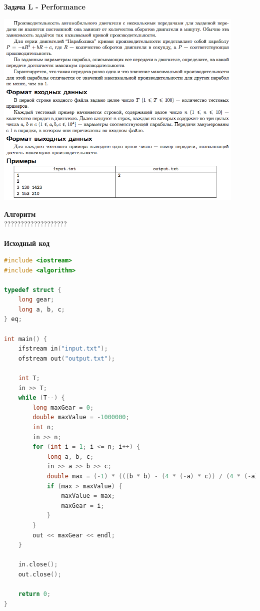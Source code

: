 \documentclass[a4paper,12pt]{article}
\begin{document}
\textbf{{\large Задача L - Performance}} \\
\begin{center}
\includegraphics[width=0.9\textwidth]{OC_Udmurtia/OC_Udmurtia_L.png}\\ [1cm]
\end{center}
\newpage

\textbf{{\large Алгоритм}} \\
{\Huge ???????????????????} \\ 
\\
\textbf{{\large Исходный код}}
\begin{lstlisting}[language=C++]
#include <iostream>
#include <algorithm>

typedef struct {
    long gear;
    long a, b, c;
} eq;

int main() {
    ifstream in("input.txt");
    ofstream out("output.txt");

    int T;
    in >> T;
    while (T--) {
        long maxGear = 0;
        double maxValue = -1000000;
        int n;
        in >> n;
        for (int i = 1; i <= n; i++) {
            long a, b, c;
            in >> a >> b >> c;
            double max = (-1) * (((b * b) - (4 * (-a) * c)) / (4 * (-a)));
            if (max > maxValue) {
                maxValue = max;
                maxGear = i;
            }
        }
        out << maxGear << endl;
    }

    in.close();
    out.close();

    return 0;
}
\end{lstlisting}
\end{document}
